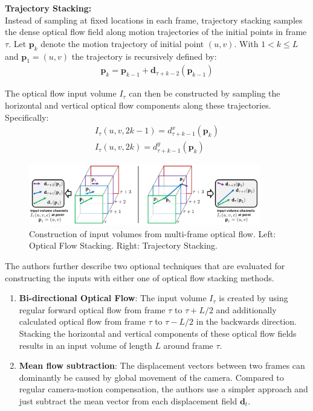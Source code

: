\textbf{Trajectory Stacking:} \\
Instead of sampling at fixed locations in each frame, trajectory stacking samples the dense optical flow field along motion trajectories of the initial points in frame $\tau$.
Let $\mathbf{p}_k$ denote the motion trajectory of initial point $(u,v)$.
With $1 < k \leq L$ and \mbox{$\mathbf{p}_1 = (u,v)$} the trajectory is recursively defined by:
\begin{align*}
    \mathbf{p}_k = \mathbf{p}_{k-1} + \mathbf{d}_{\tau + k - 2}(\mathbf{p}_{k-1})
\end{align*}

The optical flow input volume $I_\tau$ can then be constructed by sampling the horizontal and vertical optical flow components along these trajectories.
Specifically:
\begin{align*}
    I_\tau(u,v,2k-1) = d_{\tau + k - 1}^x(\mathbf{p}_{k}) \\
    I_\tau(u,v,2k) = d_{\tau + k - 1}^y(\mathbf{p}_{k})
\end{align*}

\begin{figure}[H]
    \centering
    \includegraphics[width=0.9\textwidth]{img_deep/trajectory_stacking}
    \caption{Construction of input volumes from multi-frame optical flow. Left: Optical Flow Stacking. Right: Trajectory Stacking. \cite{simonyan_two-stream_2014}}
    \label{fig:trajectory_stacking}
\end{figure}

The authors further describe two optional techniques that are evaluated for constructing the inputs with either one of optical flow stacking methods.
\begin{enumerate}
    \item \textbf{Bi-directional Optical Flow}: The input volume $I_{\tau}$ is created by using regular forward optical flow from frame $\tau$ to $\tau + L/2$ and additionally calculated optical flow from frame $\tau$ to $\tau - L/2$ in the backwards direction. Stacking the horizontal and vertical components of these optical flow fields results in an input volume of length $L$ around frame $\tau$. 
    \item \textbf{Mean flow subtraction}: The displacement vectors between two frames can dominantly be caused by global movement of the camera. Compared to regular camera-motion compensation, the authors use a simpler approach and just subtract the mean vector from each displacement field $\mathbf{d}_t$.
\end{enumerate}

